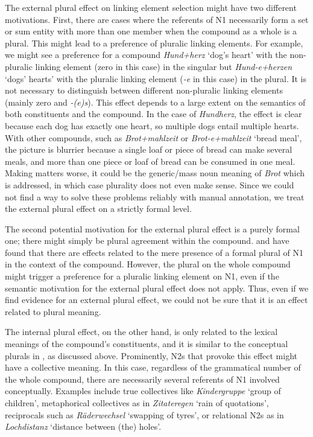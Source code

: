 \vspace{\baselineskip}

The external plural effect on linking element selection might have two different motivations.
First, there are cases where the referents of N1 necessarily form a set or sum entity with more than one member when the compound as a whole is a plural.
This might lead to a preference of pluralic linking elements.
For example, we might see a preference for a compound \textit{Hund+herz} `dog's heart' with the non-pluralic linking element (zero in this case) in the singular but \textit{Hund-e+herzen} `dogs' hearts' with the pluralic linking element (\textit{-e} in this case) in the plural.
It is not necessary to distinguish between different non-pluralic linking elements (mainly zero and \textit{-(e)s}).
This effect depends to a large extent on the semantics of both constituents and the compound.
In the case of \textit{Hundherz}, the effect is clear because each dog has exactly one heart, so multiple dogs entail multiple hearts.
With other compounds, such as \textit{Brot+mahlzeit} or \textit{Brot-e+mahlzeit} `bread meal', the picture is blurrier because a single loaf or piece of bread can make several meals, and more than one piece or loaf of bread can be consumed in one meal.
Making matters worse, it could be the generic\slash mass noun meaning of \textit{Brot} which is addressed, in which case plurality does not even make sense.
Since we could not find a way to solve these problems reliably with manual annotation, we treat the external plural effect on a strictly formal level.

The second potential motivation for the external plural effect is a purely formal one; there might simply be plural agreement within the compound.
\textcite{BangaEa2013a} and \textcite{BangaEa2013b} have found that there are effects related to the mere presence of a formal plural of N1 in the context of the compound.
However, the plural on the whole compound might trigger a preference for a pluralic linking element on N1, even if the semantic motivation for the external plural effect does not apply.
Thus, even if we find evidence for an external plural effect, we could not be sure that it is an effect related to plural meaning.

The internal plural effect, on the other hand, is only related to the lexical meanings of the compound's constituents, and it is similar to the conceptual plurals in \textcite{BangaEa2013b}, as discussed above.
Prominently, N2s that provoke this effect might have a collective meaning.
In this case, regardless of the grammatical number of the whole compound, there are necessarily several referents of N1 involved conceptually.
Examples include true collectives like \textit{Kindergruppe} `group of children', metaphorical collectives as in \textit{Zitateregen} `rain of quotations', reciprocals such as \textit{Räderwechsel} `swapping of tyres', or relational N2s as in \textit{Lochdistanz} `distance between (the) holes'.

